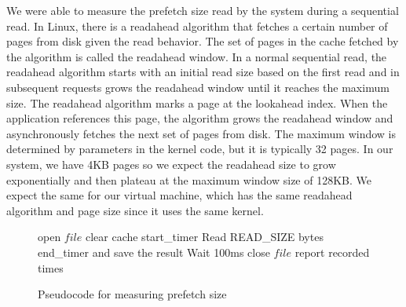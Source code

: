 We were able to measure the prefetch size read by the system during a sequential 
read. In Linux, there is a readahead algorithm that fetches a certain number of 
pages from disk given the read behavior. The set of pages in the cache fetched by 
the algorithm is called the readahead window. In a normal sequential read, the 
readahead algorithm starts with an initial read size based on the first read and in
subsequent requests grows the readahead window until it reaches the maximum size. 
The readahead algorithm marks a page at the lookahead index. When the application 
references this page, the algorithm grows the readahead window and asynchronously 
fetches the next set of pages from disk.\cite{wu2010sequential}\cite{wu2007linux} 
The maximum window is determined by 
parameters in the kernel code, but it is typically 32 pages. In our system, we have
4KB pages so we expect the readahead size to grow exponentially and then plateau at
the maximum window size of 128KB. We expect the same for our virtual machine, which 
has the same readahead algorithm and page size since it uses the same kernel.

\begin{figure}[t!]
	\begin{algorithmic}
		\STATE open $file$
		\STATE clear cache
		\STATE start\_timer
		\STATE Read READ\_SIZE bytes
		\STATE end\_timer and save the result
		\STATE Wait 100ms
		\ENDFOR
		\STATE close $file$
		\STATE report recorded times
	\end{algorithmic}
	\caption{Pseudocode for measuring prefetch size}
	\label{fig:p2_code}
\end{figure}

